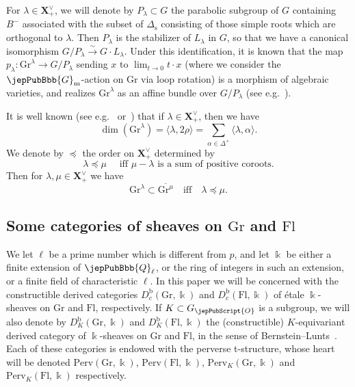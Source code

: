 For $\lambda \in \boldsymbol{X}^\vee_+$, we will denote by $P_\lambda \subset G$ the parabolic subgroup of $G$ containing $B^-$ associated with the subset of $\Delta_{\mathrm{s}}$ consisting of those simple roots which are orthogonal to $\lambda$. Then $P_\lambda$ is the stabilizer of $L_\lambda$ in $G$, so that we have a canonical isomorphism $G/P_\lambda \xrightarrow{\sim} G \cdot L_\lambda$. Under this identification, it is known that the map $p_\lambda : \mathrm{Gr}^\lambda \to G/P_\lambda$ sending $x$ to $\lim_{t \to 0} t \cdot x$ (where we consider the $\jepPubBbb{G}_{\mathrm{m}}$-action on $\mathrm{Gr}$ via loop rotation) is a morphism of algebraic varieties, and realizes $\mathrm{Gr}^\lambda$ as an affine bundle over $G/P_\lambda$ (see e.g.~\cite[Lem.~2.3]{jep104ref38}).

It is well known (see e.g.~\cite{jep104ref33} or~\cite[\S 2]{jep104ref38}) that if $\lambda \in \boldsymbol{X}^\vee_+$, then we have
\[
\dim(\mathrm{Gr}^\lambda) = \langle \lambda, 2\rho \rangle = \sum_{\alpha \in \Delta^+} \langle \lambda, \alpha \rangle.
\]
We denote by $\preccurlyeq$ the order on $\boldsymbol{X}^\vee_+$ determined by
\[
\lambda \preccurlyeq \mu \quad \text{ iff $\mu - \lambda$ is a sum of positive coroots.}
\]
Then for $\lambda, \mu \in \boldsymbol{X}^\vee_+$ we have
\[
\mathrm{Gr}^\lambda \subset \overline{\mathrm{Gr}^\mu} \quad \text{iff} \quad \lambda \preccurlyeq \mu.
\]

\subsection{Some categories of sheaves on \texorpdfstring{$\mathrm{Gr}$}{Gr} and \texorpdfstring{$\mathrm{Fl}$}{Fl}}
\label{jep104local031}

We let $\ell$ be a prime number which is different from $p$, and let $\Bbbk$ be either a finite extension of $\jepPubBbb{Q}_\ell$, or the ring of integers in such an extension, or a finite field of characteristic $\ell$. In this paper we will be concerned with the constructible derived categories $D^{\mathrm{b}}_c(\mathrm{Gr},\Bbbk)$ and $D^{\mathrm{b}}_c(\mathrm{Fl},\Bbbk)$ of \'etale $\Bbbk$-sheaves on $\mathrm{Gr}$ and $\mathrm{Fl}$, respectively.
If $K \subset G_{\jepPubScript{O}}$ is a subgroup, we will also denote by $D^{\mathrm{b}}_K(\mathrm{Gr},\Bbbk)$ and $D^{\mathrm{b}}_K(\mathrm{Fl},\Bbbk)$ the (constructible) $K$-equivariant derived category of $\Bbbk$-sheaves on $\mathrm{Gr}$ and $\mathrm{Fl}$, in the sense of Bernstein--Lunts~\cite{jep104ref15}. Each of these categories is endowed with the perverse t-structure, whose heart will be denoted $\mathrm{Perv}(\mathrm{Gr},\Bbbk)$, $\mathrm{Perv}(\mathrm{Fl},\Bbbk)$, $\mathrm{Perv}_K(\mathrm{Gr},\Bbbk)$ and $\mathrm{Perv}_K(\mathrm{Fl},\Bbbk)$ respectively.

